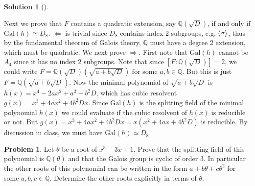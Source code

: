 \documentclass{article}
\theoremstyle{definition}
\newtheorem{prob}{Problem}
\newtheorem*{sol}{Solution}
\newenvironment{sols}[1][]{%
  \begin{sol}[#1]$ $\par\nobreak\ignorespaces
}{%
  \end{sol}
}
\newcommand{\QQ}{\mathbb Q}
\newcommand{\Ra}{\Rightarrow}
\newcommand{\La}{\Leftarrow}
\newcommand{\Gal}{\text{Gal}}
\begin{document}
\begin{sols}
	\par Next we prove that $F$ contains a quadratic extension, say $\QQ(\sqrt{D})$, if and only if $\Gal(h) \simeq D_8$.
	$\La$ is trivial since $D_8$ contains index 2 subgroups, e.g. $\ev{\sigma}$, thus by the fundamental theorem of Galois theory, $\QQ$ must have a degree 2 extension, which must be quadratic.
	We next prove $\Ra$.
	First note that $\Gal(h)$ cannot be $A_4$ since it has no index 2 subgroups.
	Note that since $[F:\QQ(\sqrt{D})] = 2$, we could write $F = \QQ(\sqrt{D})(\sqrt{a + b \sqrt{D}})$ for some $a, b \in \QQ$.
	But this is just $F = \QQ(\sqrt{a + b\sqrt{D}})$.
	Now the minimal polynomial of $\sqrt{a + b\sqrt{D}}$ is $h(x) = x^4 - 2a x^2 + a^2 - b^2 D$, which has cubic resolvent $g(x) = x^3 + 4 a x^2 + 4 b^2 D x$.
	Since $\Gal(h)$ is the splitting field of the minimal polynomial $h(x)$ we could evaluate if the cubic resolvent of $h(x)$ is reducible or not.
	But $g(x) = x^3 + 4 a x^2 + 4 b^2 D x = x (x^2 + 4 a x + 4 b^2 D)$ is reducible.
	By discussion in class, we must have $\Gal(h) \simeq D_8$.

\end{sols}

\setcounter{prob}{17}
\begin{prob}
	Let $\theta$ be a root of $x^3 - 3 x + 1$.
	Prove that the splitting field of this polynomial is $\QQ(\theta)$ and that the Galois group is cyclic of order 3.
	In particular the other roots of this polynomial can be written in the form $a + b \theta + c \theta^2$ for some $a, b, c \in \QQ$.
	Determine the other roots explicitly in terms of $\theta$.
\end{prob}
\end{document}
